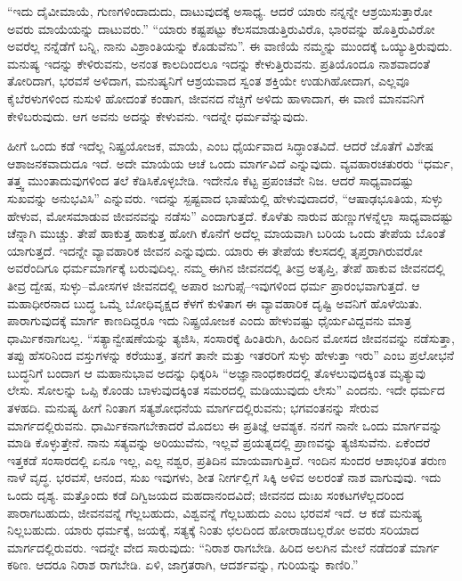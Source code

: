 “ಇದು ದೈವೀಮಾಯೆ, ಗುಣಗಳಿಂದಾದುದು, ದಾಟುವುದಕ್ಕೆ ಅಸಾಧ್ಯ. ಆದರೆ ಯಾರು ನನ್ನನ್ನೇ ಆಶ್ರಯಿಸುತ್ತಾರೋ ಅವರು ಮಾಯೆಯನ್ನು ದಾಟುವರು.” “ಯಾರು ಕಷ್ಟಪಟ್ಟು ಕೆಲಸಮಾಡುತ್ತಿರುವಿರೊ, ಭಾರವನ್ನು ಹೊತ್ತಿರುವಿರೋ ಅವರೆಲ್ಲ ನನ್ನೆಡೆಗೆ ಬನ್ನಿ, ನಾನು ವಿಶ್ರಾಂತಿಯನ್ನು ಕೊಡುವೆನು”. ಈ ವಾಣಿಯೆ ನಮ್ಮನ್ನು ಮುಂದಕ್ಕೆ ಒಯ್ಯುತ್ತಿರುವುದು. ಮನುಷ್ಯ ಇದನ್ನು ಕೇಳಿರುವನು, ಅನಂತ ಕಾಲದಿಂದಲೂ ಇದನ್ನು ಕೇಳುತ್ತಿರುವನು. ಪ್ರತಿಯೊಂದೂ ನಾಶವಾದಂತೆ ತೋರಿದಾಗ, ಭರವಸೆ ಅಳಿದಾಗ, ಮನುಷ್ಯನಿಗೆ ಆಶ್ರಯವಾದ ಸ್ವಂತ ಶಕ್ತಿಯೇ ಉಡುಗಿಹೋದಾಗ, ಎಲ್ಲವೂ ಕೈಬೆರಳುಗಳಿಂದ ನುಸುಳಿ ಹೋದಂತೆ ಕಂಡಾಗ, ಜೀವನದ ನೆಚ್ಚಿಗೆ ಅಳಿದು ಹಾಳಾದಾಗ, ಈ ವಾಣಿ ಮಾನವನಿಗೆ ಕೇಳಿಬರುವುದು. ಆಗ ಅವನು ಅದನ್ನು ಕೇಳುವನು. ಇದನ್ನೇ ಧರ್ಮವೆನ್ನುವುದು.

ಹೀಗೆ ಒಂದು ಕಡೆ ಇದೆಲ್ಲ ನಿಷ್ಪ್ರಯೋಜಕ, ಮಾಯೆ, ಎಂಬ ಧೈರ್ಯವಾದ ಸಿದ್ಧಾಂತವಿದೆ. ಆದರೆ ಜೊತೆಗೆ ವಿಶೇಷ ಆಶಾಜನಕವಾದುದೂ ಇದೆ. ಅದೇ ಮಾಯೆಯ ಆಚೆ ಒಂದು ಮಾರ್ಗವಿದೆ ಎನ್ನುವುದು. ವ್ಯವಹಾರಚತುರರು “ಧರ್ಮ, ತತ್ತ್ವ ಮುಂತಾದುವುಗಳಿಂದ ತಲೆ ಕೆಡಿಸಿಕೊಳ್ಳಬೇಡಿ. ಇದೇನೊ ಕೆಟ್ಟ ಪ್ರಪಂಚವೇ ನಿಜ. ಆದರೆ ಸಾಧ್ಯವಾದಷ್ಟು ಸುಖವನ್ನು ಅನುಭವಿಸಿ” ಎನ್ನುವರು. ಇದನ್ನು ಸ್ಪಷ್ಟವಾದ ಭಾಷೆಯಲ್ಲಿ ಹೇಳುವುದಾದರೆ, “ಆಷಾಢಭೂತಿಯ, ಸುಳ್ಳು ಹೇಳುವ, ಮೋಸಮಾಡುವ ಜೀವನವನ್ನು ನಡೆಸು” ಎಂದಾಗುತ್ತದೆ. ಕೊಳೆತು ನಾರುವ ಹುಣ್ಣುಗಳನ್ನೆಲ್ಲಾ ಸಾಧ್ಯವಾದಷ್ಟು ಚೆನ್ನಾಗಿ ಮುಚ್ಚು. ತೇಪೆ ಹಾಕುತ್ತ ಹಾಕುತ್ತ ಹೋಗಿ ಕೊನೆಗೆ ಅದೆಲ್ಲ ಮಾಯವಾಗಿ ಬರಿಯ ಒಂದು ತೇಪೆಯ ಬೊಂತೆ ಯಾಗುತ್ತದೆ. ಇದನ್ನೇ ವ್ಯಾವಹಾರಿಕ ಜೀವನ ಎನ್ನುವುದು. ಯಾರು ಈ ತೇಪೆಯ ಕೆಲಸದಲ್ಲಿ ತೃಪ್ತರಾಗಿರುವರೋ ಅವರೆಂದಿಗೂ ಧರ್ಮಮಾರ್ಗಕ್ಕೆ ಬರುವುದಿಲ್ಲ. ನಮ್ಮ ಈಗಿನ ಜೀವನದಲ್ಲಿ ತೀವ್ರ ಅತೃಪ್ತಿ, ತೇಪೆ ಹಾಕುವ ಜೀವನದಲ್ಲಿ ತೀವ್ರ ದ್ವೇಷ, ಸುಳ್ಳು–ಮೋಸಗಳ ಜೀವನದಲ್ಲಿ ಅಪಾರ ಜುಗುಪ್ಸೆ–ಇವುಗಳಿಂದ ಧರ್ಮ ಪ್ರಾರಂಭವಾಗುತ್ತದೆ. ಆ ಮಹಾಧೀರನಾದ ಬುದ್ಧ ಒಮ್ಮೆ ಬೋಧಿವೃಕ್ಷದ ಕೆಳಗೆ ಕುಳಿತಾಗ ಈ ವ್ಯಾವಹಾರಿಕ ದೃಷ್ಟಿ ಅವನಿಗೆ ಹೊಳೆಯಿತು. ಪಾರಾಗುವುದಕ್ಕೆ ಮಾರ್ಗ ಕಾಣದಿದ್ದರೂ ಇದು ನಿಷ್ಪ್ರಯೋಜಕ ಎಂದು ಹೇಳುವಷ್ಟು ಧೈರ್ಯವಿದ್ದವನು ಮಾತ್ರ ಧಾರ್ಮಿಕನಾಗಬಲ್ಲ. “ಸತ್ಯಾನ್ವೇಷಣೆಯನ್ನು ತ್ಯಜಿಸಿ, ಸಂಸಾರಕ್ಕೆ ಹಿಂತಿರುಗಿ, ಹಿಂದಿನ ಮೋಸದ ಜೀವನವನ್ನು ನಡೆಸುತ್ತಾ, ತಪ್ಪು ಹೆಸರಿನಿಂದ ವಸ್ತುಗಳನ್ನು ಕರೆಯುತ್ತ, ತನಗೆ ತಾನೇ ಮತ್ತು ಇತರರಿಗೆ ಸುಳ್ಳು ಹೇಳುತ್ತಾ ಇರು” ಎಂಬ ಪ್ರಲೋಭನೆ ಬುದ್ಧನಿಗೆ ಬಂದಾಗ ಆ ಮಹಾನುಭಾವ ಅದನ್ನು ಧಿಕ್ಕರಿಸಿ “ಅಜ್ಞಾನಾಂಧಕಾರದಲ್ಲಿ ತೊಳಲುವುದಕ್ಕಿಂತ ಮೃತ್ಯುವು ಲೇಸು. ಸೋಲನ್ನು ಒಪ್ಪಿ ಕೊಂಡು ಬಾಳುವುದಕ್ಕಿಂತ ಸಮರದಲ್ಲಿ ಮಡಿಯುವುದು ಲೇಸು” ಎಂದನು. ಇದೇ ಧರ್ಮದ ತಳಹದಿ. ಮನುಷ್ಯ ಹೀಗೆ ನಿಂತಾಗ ಸತ್ಯಶೋಧನೆಯ ಮಾರ್ಗದಲ್ಲಿರುವನು; ಭಗವಂತನನ್ನು ಸೇರುವ ಮಾರ್ಗದಲ್ಲಿರುವನು. ಧಾರ್ಮಿಕನಾಗಬೇಕಾದರೆ ಮೊದಲು ಈ ಪ್ರತಿಜ್ಞೆ ಆವಶ್ಯಕ. ನನಗೆ ನಾನೇ ಒಂದು ಮಾರ್ಗವನ್ನು ಮಾಡಿ ಕೊಳ್ಳುತ್ತೇನೆ. ನಾನು ಸತ್ಯವನ್ನು ಅರಿಯುವೆನು, ಇಲ್ಲವೆ ಪ್ರಯತ್ನದಲ್ಲಿ ಪ್ರಾಣವನ್ನು ತ್ಯಜಿಸುವೆನು. ಏಕೆಂದರೆ ಇತ್ತಕಡೆ ಸಂಸಾರದಲ್ಲಿ ಏನೂ ಇಲ್ಲ, ಎಲ್ಲ ನಶ್ವರ, ಪ್ರತಿದಿನ ಮಾಯವಾಗುತ್ತಿದೆ. ಇಂದಿನ ಸುಂದರ ಆಶಾಭರಿತ ತರುಣ ನಾಳೆ ವೃದ್ಧ. ಭರವಸೆ, ಆನಂದ, ಸುಖ ಇವುಗಳು, ಶೀತ ನೀರ್ಗಲ್ಲಿಗೆ ಸಿಕ್ಕಿ ಅಳಿವ ಅಲರಂತೆ ನಾಶ ವಾಗುವುವು. ಇದು ಒಂದು ದೃಶ್ಯ. ಮತ್ತೊಂದು ಕಡೆ ದಿಗ್ವಿಜಯದ ಮಹದಾನಂದವಿದೆ; ಜೀವನದ ದುಃಖ ಸಂಕಟಗಳೆಲ್ಲದರಿಂದ ಪಾರಾಗಬಹುದು, ಜೀವನವನ್ನೆ ಗೆಲ್ಲಬಹುದು, ವಿಶ್ವವನ್ನೆ ಗೆಲ್ಲಬಹುದು ಎಂಬ ಭರವಸೆ ಇದೆ. ಆ ಕಡೆ ಮನುಷ್ಯ ನಿಲ್ಲಬಹುದು. ಯಾರು ಧರ್ಮಕ್ಕೆ, ಜಯಕ್ಕೆ, ಸತ್ಯಕ್ಕೆ ನಿಂತು ಛಲದಿಂದ ಹೋರಾಡಬಲ್ಲರೋ ಅವರು ಸರಿಯಾದ ಮಾರ್ಗದಲ್ಲಿರುವರು. ಇದನ್ನೇ ವೇದ ಸಾರುವುದು: “ನಿರಾಶ ರಾಗಬೇಡಿ. ಹಿರಿದ ಅಲಗಿನ ಮೇಲೆ ನಡೆದಂತೆ ಮಾರ್ಗ ಕಠಿಣ. ಆದರೂ ನಿರಾಶ ರಾಗಬೇಡಿ. ಏಳಿ, ಜಾಗ್ರತರಾಗಿ, ಆದರ್ಶವನ್ನು, ಗುರಿಯನ್ನು ಕಾಣಿರಿ.”

